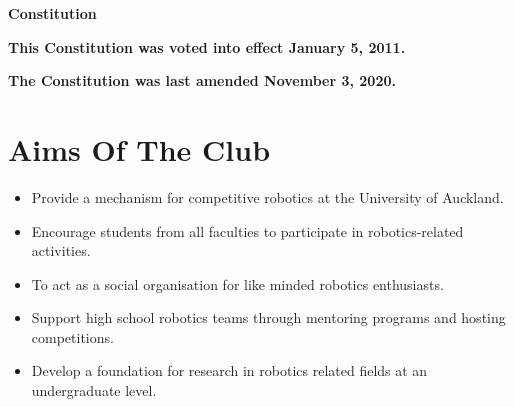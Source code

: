 \documentclass[a4paper]{article}
\begin{document}
	\textbf{
		\underline{}
	}

	\vspace{0.1in}
	
	{
		\LARGE
		\centerline{\textbf{Constitution}}
	}

	\vspace{0.1in}
	
	\textbf{This Constitution was voted into effect January 5, 2011.}
	
	\textbf{The Constitution was last amended November 3, 2020.}
	
	\section*{Aims Of The Club}
	
	\begin{itemize}
		\item Provide a mechanism for competitive robotics at the University of Auckland.
		\item Encourage students from all faculties to participate in robotics-related activities.
		\item To act as a social organisation for like minded robotics enthusiasts.
		\item Support high school robotics teams through mentoring programs and hosting competitions.
		\item Develop a foundation for research in robotics related fields at an undergraduate level.
	\end{itemize}
	
\end{document}
